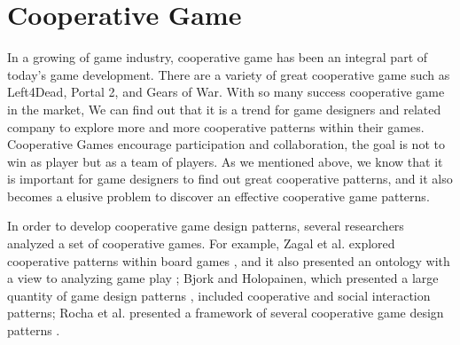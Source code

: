 \section{Cooperative Game}


In a growing of game industry, cooperative game has been an integral part of today's game development. There are a variety of great cooperative game such as Left4Dead, Portal 2, and Gears of War. With so many success cooperative game in the market, We can find out that it is a trend for game designers and related company to explore more and more cooperative patterns within their games. Cooperative Games encourage participation and collaboration, the goal is not to win as player but as a team of players. As we mentioned above, we know that it  is important for game designers to find out great cooperative patterns, and it also becomes a elusive problem to discover an effective cooperative game patterns.


In order to develop cooperative game design patterns, several researchers analyzed a set of cooperative games. For example, Zagal et al. explored cooperative patterns within board games \cite{CG1}, and it also presented an ontology with a view to analyzing game play \cite{CG3}; Bjork and Holopainen, which presented a large quantity of game design patterns \cite{CG2}, included cooperative and social interaction patterns; Rocha et al. presented a framework of several cooperative game design patterns \cite{CG4}.


